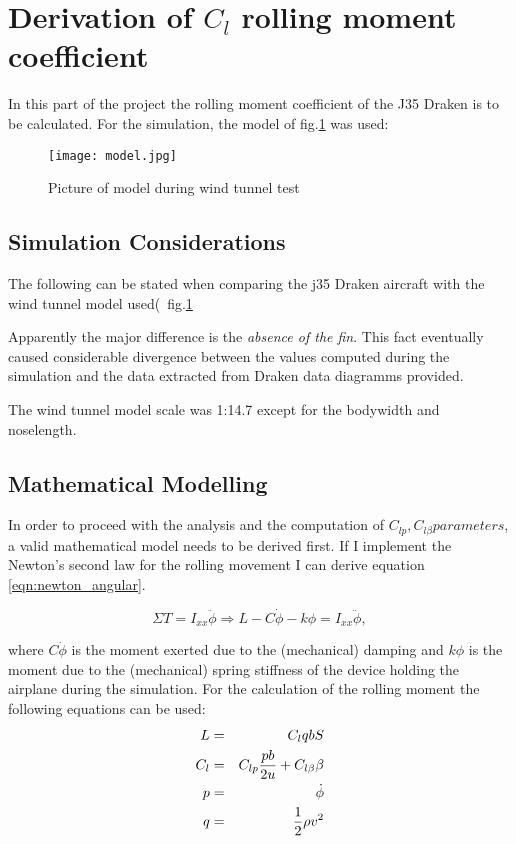 \section{Derivation of $C_{l}$ rolling moment coefficient}
In this part of the project the rolling moment coefficient of the J35 Draken is to be calculated.
For the simulation, the model of fig.\ref{fig:model} was used:

\begin{figure}[H]
    \begin{center}
        \texttt{[image: model.jpg]} %
    \end{center}
    \caption{Picture of model during wind tunnel test}
    \label{fig:model}
\end{figure}

\subsection{Simulation Considerations}

The following can be stated when comparing the j35 Draken aircraft with the wind tunnel model used(~fig.\ref{fig:model}
\begin{itemize*}
    \item Apparently the major difference is the \textit{absence of the fin}. 
        This fact eventually caused considerable divergence between the values computed during the 
        simulation and the data extracted from Draken data diagramms provided.
    \item The wind tunnel model scale was 1:14.7 except for the bodywidth
        and noselength. 
\end{itemize*}


\subsection{Mathematical Modelling}
In order to proceed with the analysis and the computation of $C_{lp}, C_{l\beta} parameters$, 
a valid mathematical model needs to be derived first. 
If I implement the Newton's second law for the rolling movement
I can derive equation \ref{eqn:newton_angular}.

\begin{equation}
    \Sigma T = I_{xx}\ddot{\phi} \Rightarrow 
    L - C\dot{\phi} - k\phi = I_{xx}\ddot{\phi},
    \label{eqn:newton_angular}
\end{equation}

\noindent where $C\dot{\phi}$ is the moment exerted due to the (mechanical) damping and $k\phi$ is
the moment due to the (mechanical) spring stiffness of the device holding the airplane during the simulation.
For the calculation of the rolling moment the following equations can be used:
\begin{eqnarray}
    L &=& C_l q b S \label{eqn:roll_moment} \label{eqn:L}\\
    C_l &=&  C_{lp}\frac{pb}{2u} + C_{l\beta}\beta \label{eqn:cl}\\
    p &=&\dot{\phi} \notag\\
    q &=&  \frac{1}{2}\rho v^2 \notag
\end{eqnarray}

